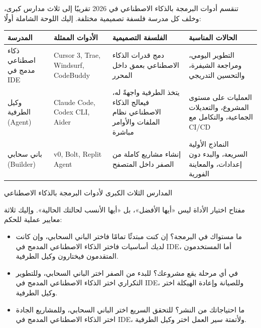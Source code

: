 


تنقسم أدوات البرمجة بالذكاء الاصطناعي في 2026 تقريبًا إلى ثلاث مدارس كبرى، وخلف كل مدرسة فلسفة تصميمية مختلفة. إليك اللوحة الشاملة أولًا:

\begin{center}
\begin{tabularx}{\linewidth}{|X|X|X|X|}
\hline
\textbf{المدرسة} & \textbf{الأدوات الممثلة} & \textbf{الفلسفة التصميمية} & \textbf{الحالات المناسبة} \tabularnewline
\hline
ذكاء اصطناعي مدمج في IDE & Cursor 3, Trae, Windsurf, CodeBuddy & دمج قدرات الذكاء الاصطناعي بعمق داخل المحرر & التطوير اليومي، ومراجعة الشيفرة، والتحسين التدريجي \tabularnewline
وكيل الطرفية (Agent) & Claude Code, Codex CLI, Aider & يتخذ الطرفية واجهةً له، فيعالج الذكاء الاصطناعي نظام الملفات والأوامر مباشرة & العمليات على مستوى المشروع، والتعديلات الجماعية، والتكامل مع CI/CD \tabularnewline
باني سحابي (Builder) & v0, Bolt, Replit Agent & إنشاء مشاريع كاملة من الصفر داخل المتصفح & النماذج الأولية السريعة، والبدء دون إعدادات، والمعاينة الفورية \tabularnewline
\hline
\end{tabularx}
\end{center}

\begin{center}\small\color{gray}المدارس الثلاث الكبرى لأدوات البرمجة بالذكاء الاصطناعي\end{center}

مفتاح اختيار الأداة ليس «أيها الأفضل»، بل «أيها الأنسب لحالتك الحالية». وإليك ثلاثة معايير عملية للحكم:

\begin{itemize}
  \item ما مستواك في البرمجة؟ إن كنت مبتدئًا تمامًا فاختر الباني السحابي، وإن كانت لديك أساسيات فاختر الذكاء الاصطناعي المدمج في IDE، أما المستخدمون المتقدمون فيختارون وكيل الطرفية.
  \item في أي مرحلة يقع مشروعك؟ للبدء من الصفر اختر الباني السحابي، وللتطوير التكراري اختر الذكاء الاصطناعي المدمج في IDE، وللصيانة وإعادة الهيكلة اختر وكيل الطرفية.
  \item ما احتياجاتك من النشر؟ للتحقق السريع اختر الباني السحابي، وللمشاريع الجادة اختر الذكاء الاصطناعي المدمج في IDE، ولأتمتة سير العمل اختر وكيل الطرفية.
\end{itemize}

